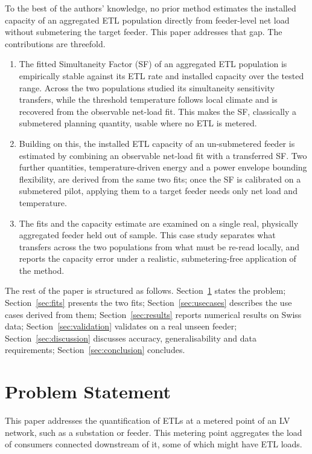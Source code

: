 \documentclass[9pt,journal,a4]{IEEEtran}
\begin{document}
To the best of the authors' knowledge, no prior method estimates the installed capacity of an aggregated ETL population directly from feeder-level net load without submetering the target feeder. This paper addresses that gap. The contributions are threefold.
\begin{enumerate}
\item The fitted Simultaneity Factor (SF) of an aggregated ETL population is empirically stable against its ETL rate and installed capacity over the tested range. Across the two populations studied its simultaneity sensitivity transfers, while the threshold temperature follows local climate and is recovered from the observable net-load fit. This makes the SF, classically a submetered planning quantity, usable where no ETL is metered.
\item Building on this, the installed ETL capacity of an un-submetered feeder is estimated by combining an observable net-load fit with a transferred SF. Two further quantities, temperature-driven energy and a power envelope bounding flexibility, are derived from the same two fits; once the SF is calibrated on a submetered pilot, applying them to a target feeder needs only net load and temperature.
\item The fits and the capacity estimate are examined on a single real, physically aggregated feeder held out of sample. This case study separates what transfers across the two populations from what must be re-read locally, and reports the capacity error under a realistic, submetering-free application of the method.
\end{enumerate}

The rest of the paper is structured as follows. Section~\ref{sec:problem} states the problem; Section~\ref{sec:fits} presents the two fits; Section~\ref{sec:usecases} describes the use cases derived from them; Section~\ref{sec:results} reports numerical results on Swiss data; Section~\ref{sec:validation} validates on a real unseen feeder; Section~\ref{sec:discussion} discusses accuracy, generalisability and data requirements; Section~\ref{sec:conclusion} concludes.


\section{Problem Statement}
\label{sec:problem}

This paper addresses the quantification of ETLs at a metered point of an LV network, such as a substation or feeder. This metering point aggregates the load of consumers connected downstream of it, some of which might have ETL loads.
\end{document}
